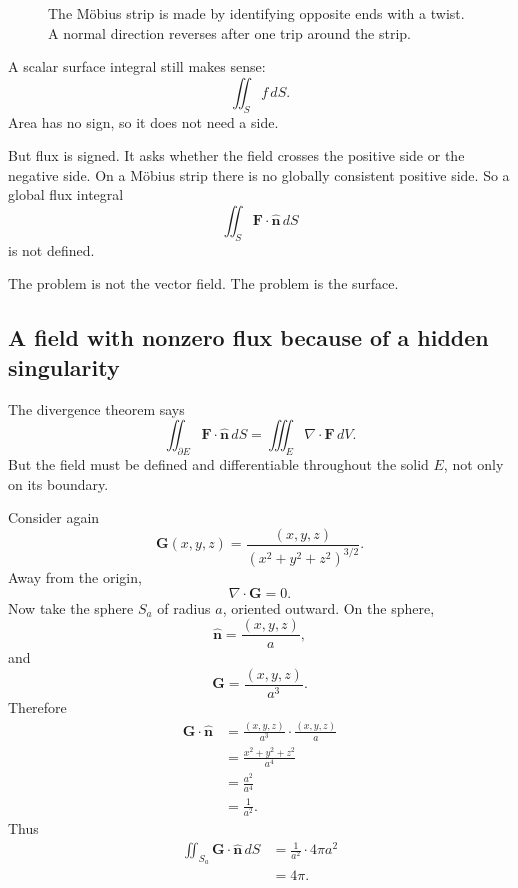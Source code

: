\begin{figure}[h]
\centering
{}
\caption{The M\"obius strip is made by identifying opposite ends with a twist.  A normal
direction reverses after one trip around the strip.}
\end{figure}

A scalar surface integral still makes sense:
\[
    \iint_S f\,dS.
\]
Area has no sign, so it does not need a side.

But flux is signed.  It asks whether the field crosses the positive side or the negative
side.  On a M\"obius strip there is no globally consistent positive side.  So a global
flux integral
\[
    \iint_S \mathbf F\cdot\widehat{\mathbf n}\,dS
\]
is not defined.

The problem is not the vector field.  The problem is the surface.

\subsection{A field with nonzero flux because of a hidden singularity}

The divergence theorem says
\[
    \iint_{\partial E}\mathbf F\cdot\widehat{\mathbf n}\,dS
    =
    \iiint_E \nabla\cdot\mathbf F\,dV.
\]
But the field must be defined and differentiable throughout the solid \(E\), not only
on its boundary.

Consider again
\[
    \mathbf G(x,y,z)
    =
    \frac{(x,y,z)}{(x^2+y^2+z^2)^{3/2}}.
\]
Away from the origin,
\[
    \nabla\cdot\mathbf G=0.
\]
Now take the sphere \(S_a\) of radius \(a\), oriented outward.  On the sphere,
\[
    \widehat{\mathbf n}=\frac{(x,y,z)}{a},
\]
and
\[
    \mathbf G=\frac{(x,y,z)}{a^3}.
\]
Therefore
\[
\begin{aligned}
\mathbf G\cdot\widehat{\mathbf n}
&=
\frac{(x,y,z)}{a^3}\cdot\frac{(x,y,z)}{a}\\
&=
\frac{x^2+y^2+z^2}{a^4}\\
&=
\frac{a^2}{a^4}\\
&=
\frac1{a^2}.
\end{aligned}
\]
Thus
\[
\begin{aligned}
\iint_{S_a}\mathbf G\cdot\widehat{\mathbf n}\,dS
&=
\frac1{a^2}\cdot 4\pi a^2\\
&=
4\pi.
\end{aligned}
\]

